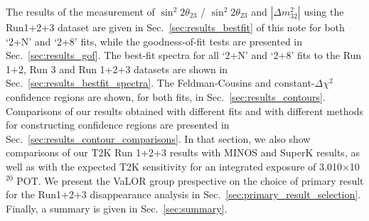 The results of the measurement of $\sin^{2}2\theta_{23}$ / $\sin^{2}2\theta_{23}$ and $|\Delta m^{2}_{32}|$ 
using the Run1+2+3 dataset are given in Sec.\ \ref{sec:results_bestfit} of this note for both `2+N' and `2+8' fits,
while the goodness-of-fit tests are presented in Sec.\ \ref{sec:results_gof}.
The best-fit spectra for all `2+N' and `2+8' fits to the Run 1+2, Run 3 and Run 1+2+3 datasets are shown in
Sec.\ \ref{sec:results_bestfit_spectra}.
The Feldman-Cousins and constant-$\Delta\chi^{2}$ confidence regions are shown, for both fits, 
in Sec.\ \ref{sec:results_contours}. Comparisons of our results obtained with different fits and with
different methods for constructing confidence regions are presented in Sec.\ \ref{sec:results_contour_comparisons}.
In that section, we also show comparisons of our T2K Run 1+2+3 results with MINOS and SuperK results, 
as well as with the expected T2K sensitivity for an integrated exposure of 3.010$\times$10$^{20}$ POT.
We present the VaLOR group prespective on the choice 
of primary result for the Run1+2+3 disappearance analysis in Sec.\ \ref{sec:primary_result_selection}.
Finally, a summary is given in Sec.\ \ref{sec:summary}.  

